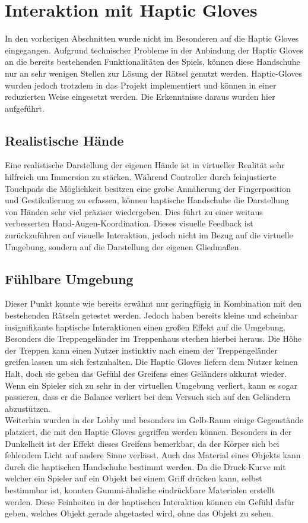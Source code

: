 \section{Interaktion mit Haptic Gloves}
In den vorherigen Abschnitten wurde nicht im Besonderen auf die Haptic Gloves eingegangen. Aufgrund technischer Probleme in der Anbindung der Haptic Gloves an die bereits bestehenden Funktionalitäten des Spiels, können diese Handschuhe nur an sehr wenigen Stellen zur Lösung der Rätsel genutzt werden. Haptic-Gloves wurden jedoch trotzdem in das Projekt implementiert und können in einer reduzierten Weise eingesetzt werden. Die Erkenntnisse daraus wurden hier aufgeführt.

\subsection{Realistische Hände}
Eine realistische Darstellung der eigenen Hände ist in virtueller Realität sehr hilfreich um Immersion zu stärken. Während Controller durch feinjustierte Touchpads die Möglichkeit besitzen eine grobe Annäherung der Fingerposition und Gestikulierung zu erfassen, können haptische Handschuhe die Darstellung von Händen sehr viel präziser wiedergeben. Dies führt zu einer weitaus verbesserten Hand-Augen-Koordination. Dieses visuelle Feedback ist zurückzuführen auf visuelle Interaktion, jedoch nicht im Bezug auf die virtuelle Umgebung, sondern auf die Darstellung der eigenen Gliedmaßen.

\subsection{Fühlbare Umgebung}
Dieser Punkt konnte wie bereits erwähnt nur geringfügig in Kombination mit den bestehenden Rätseln getestet werden. Jedoch haben bereits kleine und scheinbar insignifikante haptische Interaktionen einen großen Effekt auf die Umgebung. Besonders die Treppengeländer im Treppenhaus stechen hierbei heraus. Die Höhe der Treppen kann einen Nutzer instinktiv nach einem der Treppengeländer greifen lassen um sich festzuhalten. Die Haptic Gloves liefern dem Nutzer keinen Halt, doch sie geben das Gefühl des Greifens eines Geländers akkurat wieder. Wenn ein Spieler sich zu sehr in der virtuellen Umgebung verliert, kann es sogar passieren, dass er die Balance verliert bei dem Versuch sich auf den Geländern abzustützen.\\

Weiterhin wurden in der Lobby und besonders im Gelb-Raum einige Gegenstände platziert, die mit den Haptic Gloves gegriffen werden können. Besonders in der Dunkelheit ist der Effekt dieses Greifens bemerkbar, da der Körper sich bei fehlendem Licht auf andere Sinne verlässt. Auch das Material eines Objekts kann durch die haptischen Handschuhe bestimmt werden. Da die Druck-Kurve mit welcher ein Spieler auf ein Objekt bei einem Griff drücken kann, selbst bestimmbar ist, konnten Gummi-ähnliche eindrückbare Materialen erstellt werden. Diese Feinheiten in der haptischen Interaktion können ein Gefühl dafür geben, welches Objekt gerade abgetasted wird, ohne das Objekt zu sehen.\\
